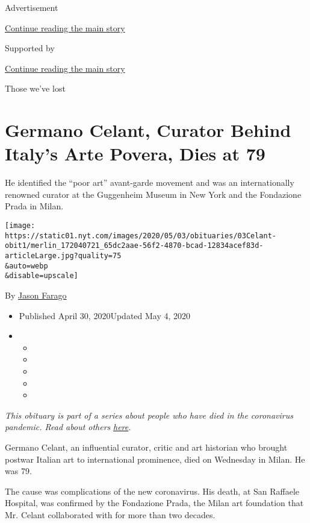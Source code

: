 Advertisement

\protect\hyperlink{after-top}{Continue reading the main story}

Supported by

\protect\hyperlink{after-sponsor}{Continue reading the main story}

Those we've lost

\hypertarget{germano-celant-curator-behind-italys-arte-povera-dies-at-79}{%
\section{Germano Celant, Curator Behind Italy's Arte Povera, Dies at
79}\label{germano-celant-curator-behind-italys-arte-povera-dies-at-79}}

He identified the ``poor art'' avant-garde movement and was an
internationally renowned curator at the Guggenheim Museum in New York
and the Fondazione Prada in Milan.

\texttt{[image: https://static01.nyt.com/images/2020/05/03/obituaries/03Celant-obit1/merlin\_172040721\_65dc2aae-56f2-4870-bcad-12834acef83d-articleLarge.jpg?quality=75\\\&auto=webp\\\&disable=upscale]}

By \href{https://www.nytimes.com/by/jason-farago}{Jason Farago}

\begin{itemize}
\item
  Published April 30, 2020Updated May 4, 2020
\item
  \begin{itemize}
  \item
  \item
  \item
  \item
  \item
  \end{itemize}
\end{itemize}

\emph{This obituary is part of a series about people who have died in
the coronavirus pandemic. Read about others}
\href{https://www.nytimes.com/series/people-who-have-died-of-the-coronavirus}{\emph{here}}\emph{.}

Germano Celant, an influential curator, critic and art historian who
brought postwar Italian art to international prominence, died on
Wednesday in Milan. He was 79.

The cause was complications of the new coronavirus. His death, at San
Raffaele Hospital, was confirmed by the Fondazione Prada, the Milan art
foundation that Mr. Celant collaborated with for more than two decades.

